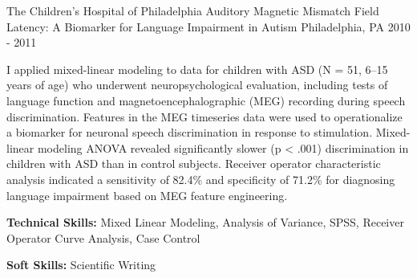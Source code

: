 \begin{cventries}
  \cventry
    {The Children's Hospital of Philadelphia} %
    {Auditory Magnetic Mismatch Field Latency: A Biomarker for Language Impairment in Autism} %
    {Philadelphia, PA} %
    {2010 - 2011} %
    {
      \begin{cvitems} %
        \item {I applied mixed-linear modeling to data for children with ASD (N = 51, 6–15 years of age) who underwent neuropsychological evaluation, including tests of language function and magnetoencephalographic (MEG) recording during speech discrimination. Features in the MEG timeseries data were used to operationalize a biomarker for neuronal speech discrimination in response to stimulation. Mixed-linear modeling ANOVA revealed significantly slower (p < .001) discrimination in children with ASD than in control subjects. Receiver operator characteristic analysis indicated a sensitivity of 82.4\% and specificity of 71.2\% for diagnosing language impairment based on MEG feature engineering.}
        \item {\textbf{Technical Skills:} Mixed Linear Modeling, Analysis of Variance, SPSS, Receiver Operator Curve Analysis, Case Control}
        \item {\textbf{Soft Skills:} Scientific Writing}
      \end{cvitems}
    }

\end{cventries}
